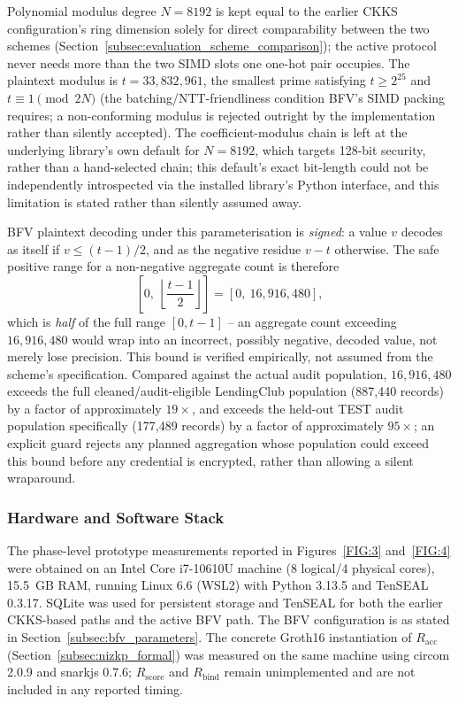 \documentclass[a4paper,fleqn]{cas-dc}
\begin{document}
Polynomial modulus degree $N=8192$ is kept equal to the earlier CKKS configuration's ring dimension solely for direct comparability between the two schemes (Section~\ref{subsec:evaluation_scheme_comparison}); the active protocol never needs more than the two SIMD slots one one-hot pair occupies. The plaintext modulus is $t=33{,}832{,}961$, the smallest prime satisfying $t\geq 2^{25}$ and $t\equiv 1 \pmod{2N}$ (the batching/NTT-friendliness condition BFV's SIMD packing requires; a non-conforming modulus is rejected outright by the implementation rather than silently accepted). The coefficient-modulus chain is left at the underlying library's own default for $N=8192$, which targets 128-bit security, rather than a hand-selected chain; this default's exact bit-length could not be independently introspected via the installed library's Python interface, and this limitation is stated rather than silently assumed away.

BFV plaintext decoding under this parameterisation is \emph{signed}: a value $v$ decodes as itself if $v\leq(t-1)/2$, and as the negative residue $v-t$ otherwise. The safe positive range for a non-negative aggregate count is therefore \[ \left[0,\ \left\lfloor \frac{t-1}{2} \right\rfloor\right] = [0,\ 16{,}916{,}480], \] which is \emph{half} of the full range $[0,t-1]$ -- an aggregate count exceeding $16{,}916{,}480$ would wrap into an incorrect, possibly negative, decoded value, not merely lose precision. This bound is verified empirically, not assumed from the scheme's specification. Compared against the actual audit population, $16{,}916{,}480$ exceeds the full cleaned/audit-eligible LendingClub population (887{,}440 records) by a factor of approximately $19\times$, and exceeds the held-out TEST audit population specifically (177{,}489 records) by a factor of approximately $95\times$; an explicit guard rejects any planned aggregation whose population could exceed this bound before any credential is encrypted, rather than allowing a silent wraparound.

\subsubsection{Hardware and Software Stack}

The phase-level prototype measurements reported in Figures~\ref{FIG:3} and~\ref{FIG:4} were obtained on an Intel Core i7-10610U machine (8 logical/4 physical cores), 15.5~GB RAM, running Linux 6.6 (WSL2) with Python 3.13.5 and TenSEAL 0.3.17. SQLite was used for persistent storage and TenSEAL for both the earlier CKKS-based paths and the active BFV path. The BFV configuration is as stated in Section~\ref{subsec:bfv_parameters}. The concrete Groth16 instantiation of $R_{\mathrm{acc}}$ (Section~\ref{subsec:nizkp_formal}) was measured on the same machine using circom 2.0.9 and snarkjs 0.7.6; $R_{\mathrm{score}}$ and $R_{\mathrm{bind}}$ remain unimplemented and are not included in any reported timing.
\end{document}
